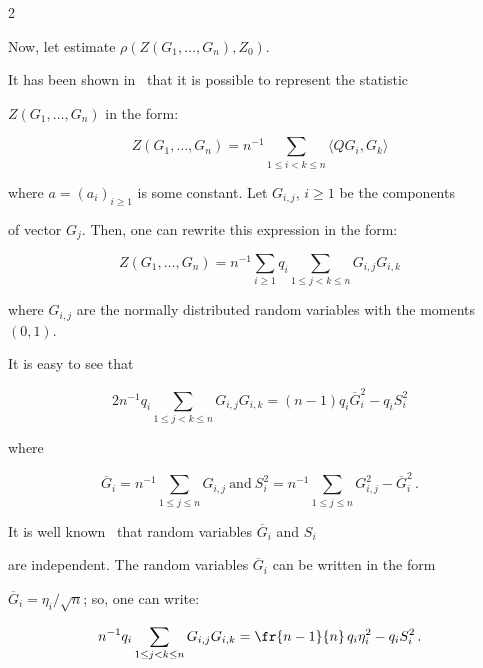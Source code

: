 \begin{multicols}{2}
\noindent

   Now, let estimate $\rho(Z(G_1,\ldots,G_n),Z_0).$



   It has been shown in~\cite{1-y} that it is possible to represent the statistic

   $Z(G_1,\ldots,G_n)$ in the form:

   $$

   Z(G_1,\ldots,G_n)=n^{-1} \sum\limits_{1\leq i<k\leq n}\langle Q G_i,G_k\rangle

$$

    where $a=(a_i)_{i\geq 1}$ is some constant. Let $G_{i,j}$,  $i \geq 1$ be the components

    of vector $G_{j}$. Then, one can rewrite this expression in the form:

    $$

    Z(G_1,\ldots,G_n)= n^{-1}\sum\limits_{i\geq 1}q_i

    \sum\limits_{1\leq j<k\leq n} G_{i,j}G_{i,k}

    $$

    where $G_{i,j}$ are the normally distributed random variables with the moments $(0,1)$.

        It is easy to see that

        $$

    2n^{-1}q_i\sum\limits_{1\leq j<k\leq n} G_{i,j}G_{i,k}=(n-1)q_i\overline{G}_i^{2}-

    q_iS_i^{2}

        $$

    where

    $$

    \overline{G}_i=n^{-1}\sum\limits_{1\leq j\leq n}G_{i,j} \

    \mbox{and} \ S_i^{2}=n^{-1}\sum\limits_{1\leq j\leq n}G_{i,j}^{2}-\overline{G}_i^{2}\,.

    $$

    It is well known~\cite{2-y} that random variables $\overline{G}_i$ and $S_i$

    are independent. The random variables $\overline{G}_i$ can be written in the form

    $\overline{G}_i =\eta_i/\sqrt{n}$; so, one can write:

    $$

    n^{-1}q_i\sum\limits_{1\leq j<k\leq n} G_{i,j}G_{i,k}=

    \fr{n-1}{n}\,q_i\eta_i^{2}-q_iS_i^{2}\,.

    $$


\end{multicols}
